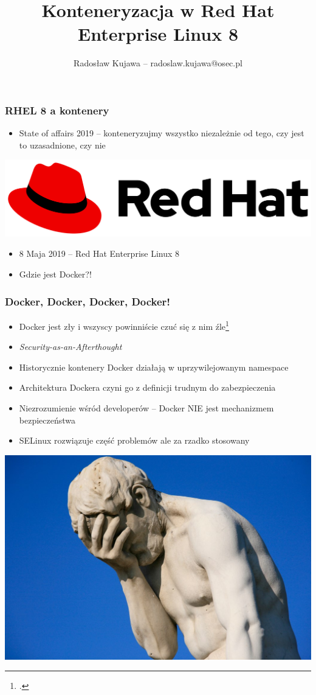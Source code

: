 \documentclass[dvipsnames,table]{beamer}
\title{Konteneryzacja w Red Hat Enterprise Linux 8}
\author{Radosław Kujawa -- radoslaw.kujawa@osec.pl}
\institute{OSEC}
\date{}
\begin{document}
\begin{frame}
	\titlepage
\end{frame}

\begin{frame}
\frametitle{RHEL 8 a kontenery}
	\begin{itemize}
		\item State of affairs 2019 -- konteneryzujmy wszystko niezależnie od tego, czy jest to uzasadnione, czy nie
	\end{itemize}
	\begin{center}
		\includegraphics[scale=0.1]{img-rhlogo.png}
	\end{center}
	\begin{itemize}
		\item 8 Maja 2019 -- Red Hat Enterprise Linux 8
		\item Gdzie jest Docker?!
	\end{itemize}
\end{frame}

\begin{frame}
	\frametitle{Docker, Docker, Docker, Docker!}
	\begin{itemize}
		\item Docker jest zły i wszyscy powinniście czuć się z nim źle\footcite{Barcamp2016}
		\item {\it Security-as-an-Afterthought}
		\item Historycznie kontenery Docker działają w uprzywilejowanym namespace
		\item Architektura Dockera czyni go z definicji trudnym do zabezpieczenia
		\item Niezrozumienie wśród developerów -- Docker NIE jest mechanizmem bezpieczeństwa
		\item SELinux rozwiązuje część problemów ale za rzadko stosowany
	\end{itemize}
	\begin{center}
		\includegraphics[scale=0.09]{img-facepalm.jpg}
	\end{center}
\end{frame}
\end{document}
